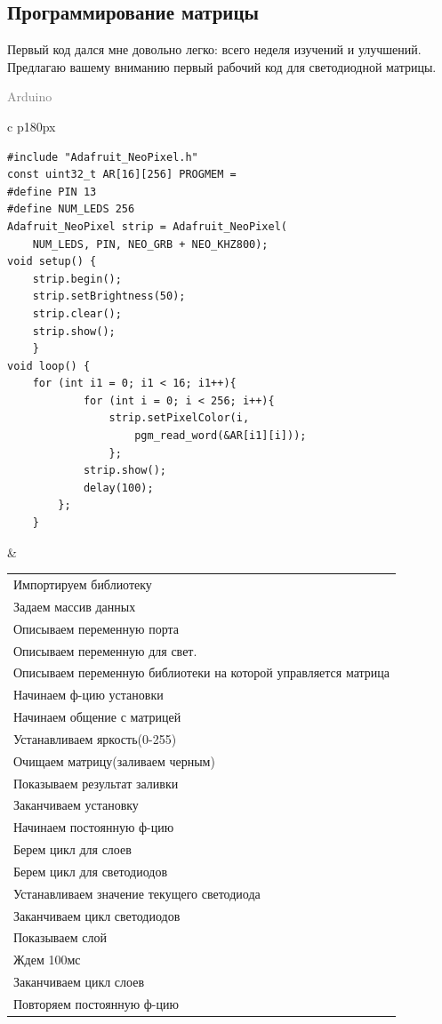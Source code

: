 \documentclass[a4paper, 12pt]{article}
\begin{document}
\subsection{Программирование матрицы}
Первый код дался мне довольно легко: всего неделя изучений и улучшений. Предлагаю
вашему вниманию первый рабочий код для светодиодной матрицы.
\begin{flushright}\begin{huge}\textcolor{grey}{Arduino}\end{huge}\end{flushright}
\begin{tabular}{c p{180px}}
  \hline
  \begin{lstlisting}[style=myLatexStyle]
#include "Adafruit_NeoPixel.h"
const uint32_t AR[16][256] PROGMEM = 
#define PIN 13        
#define NUM_LEDS 256   
Adafruit_NeoPixel strip = Adafruit_NeoPixel(
    NUM_LEDS, PIN, NEO_GRB + NEO_KHZ800);
void setup() {
    strip.begin();
    strip.setBrightness(50);    
    strip.clear();                          
    strip.show();                           
	}
void loop() {
    for (int i1 = 0; i1 < 16; i1++){
			for (int i = 0; i < 256; i++){
				strip.setPixelColor(i,
					pgm_read_word(&AR[i1][i]));
				};
			strip.show();
			delay(100);
		};
	}
\end{lstlisting}
   &
  \begin{tabular}{p{180px}}
    Импортируем библиотеку           \\
    Задаем массив данных             \\
    Описываем переменную порта       \\
    Описываем переменную для свет.   \\
    Описываем переменную библиотеки
    на которой управляется матрица   \\
    Начинаем ф-цию установки         \\
    Начинаем общение с матрицей      \\
    Устанавливаем яркость(0-255)     \\
    Очищаем матрицу(заливаем черным) \\
    Показываем результат заливки     \\
    Заканчиваем установку            \\
    Начинаем постоянную ф-цию        \\
    Берем цикл для слоев             \\
    Берем цикл для светодиодов       \\
    Устанавливаем значение
    текущего светодиода              \\
    Заканчиваем цикл светодиодов     \\
    Показываем слой                  \\
    Ждем 100мс                       \\
    Заканчиваем цикл слоев           \\
    Повторяем постоянную ф-цию       \\
  \end{tabular} \\
\end{tabular}
\end{document}
